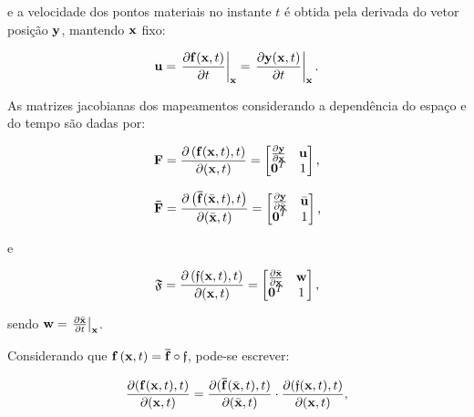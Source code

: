 \noindent e a velocidade dos pontos materiais no instante $t$ é obtida pela derivada do vetor posição $\mathbf{y}$, mantendo $\mathbf{x}$ fixo:

\begin{align}
	\mathbf{u} = \left. \frac{\partial \mathbf{f}(\mathbf{x},t)}{\partial t} \right|_{\mathbf{x}} = \left. \frac{\partial \mathbf{y}(\mathbf{x},t)}{\partial t} \right|_{\mathbf{x}}.
\end{align}

As matrizes jacobianas dos mapeamentos considerando a dependência do espaço e do tempo são dadas por:

\begin{equation} 
	\mathbf{F} = \frac{\partial \left(\mathbf{f}(\mathbf{x},t),t\right)}{\partial (\mathbf{x},t)}=
	\begin{bmatrix}
		\frac{\partial {\mathbf{y}}}{\partial {\mathbf{x}}} & \mathbf{u} \\
		\mathbf{0}^T & 1 \\
	\end{bmatrix}
	\text{,}
\end{equation}

\begin{equation} 
	\mathbf{\bar{F}} = \frac{\partial \left(\mathbf{\bar{f}}(\bar{\mathbf{x}},t),t\right)}{\partial (\bar{\mathbf{x}},t)}=
	\begin{bmatrix}
		\frac{\partial {\mathbf{y}}}{\partial {\bar{\mathbf{x}}}} & \bar{\mathbf{u}} \\
		\mathbf{0}^T & 1 \\
	\end{bmatrix}
	\text{,}
\end{equation}

\noindent e

\begin{equation}
	\mathfrak{F} = \frac{\partial \left({\mathfrak{f}}(\mathbf{x},t),t\right)}{\partial (\mathbf{x},t)}=
	\begin{bmatrix}
		\frac{\partial {\bar{\mathbf{x}}}}{\partial {\mathbf{x}}} & \mathbf{w} \\
		\mathbf{0}^T & 1 \\
	\end{bmatrix}
	\text{,}
\end{equation}

\noindent sendo $\mathbf{w} = \left. \frac{\partial \bar{\mathbf{x}}}{\partial t} \right|_{\mathbf{x}}$.

Considerando que $\mathbf{f}\left(\mathbf{x},t\right) = \mathbf{\bar{f}} \circ \mathfrak{f}$, pode-se escrever:

\begin{align}
	\frac{\partial(\mathbf{f}(\mathbf{x},t),t)}{\partial(\mathbf{x},t)} = \frac{\partial(\mathbf{\bar{f}}(\bar{\mathbf{x}},t),t)}{\partial(\bar{\mathbf{x}},t)} \cdot \frac{\partial(\mathfrak{f}(\mathbf{x},t),t)}{\partial(\mathbf{x},t)},
\end{align}


